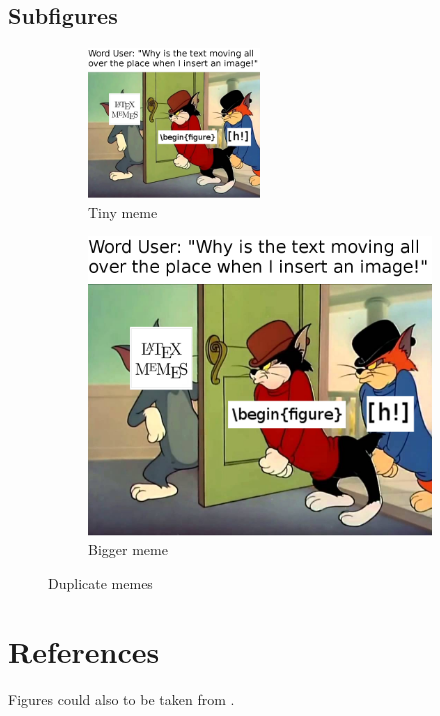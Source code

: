 \documentclass[12pt,a4paper]{article}
\begin{document}
\subsection{Subfigures}
\begin{figure}

    \begin{subfigure}[t]{0.4\textwidth}
    \centering
    \includegraphics[width=0.5\textwidth]{figures/beginfigurememe.png}
    \caption{Tiny meme}
    \end{subfigure}
   \hspace{1em} %
    \begin{subfigure}[t]{0.4\textwidth}
    \centering
    \includegraphics[width=\textwidth]{figures/beginfigurememe.png}
    \caption{Bigger meme}
    \end{subfigure}
    \caption{Duplicate memes}
    \label{fig:meme_subfigure}
\end{figure}


\section{References}
Figures could also to be taken from \cite{yuan2021wave}.


    
\end{document}
